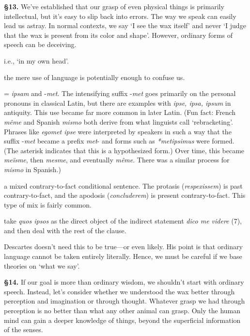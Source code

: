 \prenotes

\textbf{§13.} We've established that our grasp of even physical things is primarily intellectual, but it's easy to slip back into errors. The way we speak can easily lead us astray. In normal contexts, we say `I see the wax itself' and never `I judge that the wax is present from its color and shape'. However, ordinary forms of speech can be deceiving.

 i.e., `in my own head'.

 the mere use of language is potentially enough to confuse us.

 = \textit{ipsam} and -\textit{met}. The intensifying suffix -\textit{met} goes primarily on the personal pronouns in classical Latin, but there are examples with \textit{ipse, ipsa, ipsum} in antiquity. This use became far more common in later Latin. (Fun fact: French \textit{même} and Spanish \textit{mismo} both derive from what linguists call `rebracketing'. Phrases like \textit{egomet ipse} were interpreted by speakers in such a way that the suffix -\textit{met} became a prefix \textit{met}- and forms such as \textit{*metipsimus} were formed. (The asterisk indicates that this is a hypothesized form.) Over time, this became \textit{meïsme}, then \textit{mesme}, and eventually \textit{même}. There was a similar process for \textit{mismo} in Spanish.)

 a mixed contrary-to-fact conditional sentence. The protasis (\textit{respexissem}) is past contrary-to-fact, and the apodosis (\textit{concluderem}) is present contrary-to-fact. This type of mix is fairly common.

 take \textit{quos ipsos} as the direct object of the indirect statement \textit{dico me videre} (7), and then deal with the rest of the clause.

 Descartes doesn't need this to be true---or even likely. His point is that ordinary language cannot be taken entirely literally. Hence, we must be careful if we base theories on `what we say'.

\textbf{§14.} If our goal is more than ordinary wisdom, we shouldn't start with ordinary speech. Instead, let's consider whether we understood the wax better through perception and imagination or through thought. Whatever grasp we had through perception is no better than what any other animal can grasp. Only the human mind can gain a deeper knowledge of things, beyond the superficial information of the senses.

